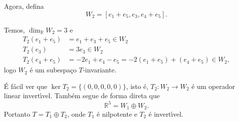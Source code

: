 \documentclass[12pt]{article}
\newcommand{\real}{\mathbb{R}}
\begin{document}
Agora, defina
\[
    W_2 = [e_1 + e_5, e_3, e_4 + e_5].
\]

Temos, $\dim_\real W_2 = 3$ e
\begin{align*}
    T_2(e_1 + e_5) &= e_1 + e_3 + e_5 \in W_2\\
    T_2(e_3) &= 3e_3 \in W_2\\
    T_2(e_4 + e_5) &= -2e_1 + e_4 - e_5 = -2(e_1 + e_5) + (e_4 + e_5) \in W_2,
\end{align*}
logo $W_2$ \'e um subespa\c{c}o $T$-invariante.

\'E f\'acil ver que $\ker T_2 = \{(0,0,0,0,0)\}$, isto \'e, $T_2 : W_2 \to W_2$ \'e um operador linear invert{\'\i}vel. Tamb\'em segue de forma direta que
\[
    \real^5 = W_1 \oplus W_2.
\]
Portanto $T = T_1 \oplus T_2$, onde $T_1$ \'e nilpotente e $T_2$ \'e invert{\'\i}vel.
\end{document}
